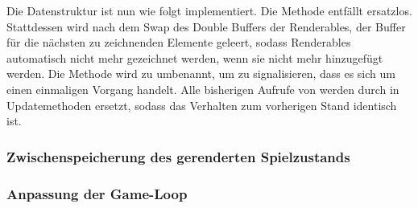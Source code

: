 Die Datenstruktur ist nun wie folgt implementiert. Die Methode  entfällt ersatzlos. Stattdessen wird nach dem Swap des Double Buffers der Renderables, der Buffer für die nächsten zu zeichnenden Elemente geleert, sodass Renderables automatisch nicht mehr gezeichnet werden, wenn sie nicht mehr hinzugefügt werden. Die Methode  wird zu  umbenannt, um zu signalisieren, dass es sich um einen einmaligen Vorgang handelt. Alle bisherigen Aufrufe von  werden durch  in Updatemethoden ersetzt, sodass das Verhalten zum vorherigen Stand identisch ist.

\subsubsection{Zwischenspeicherung des gerenderten Spielzustands}\label{sec:saveRenderState}


\subsubsection{Anpassung der Game-Loop}\label{sec:adjustGameLoop}